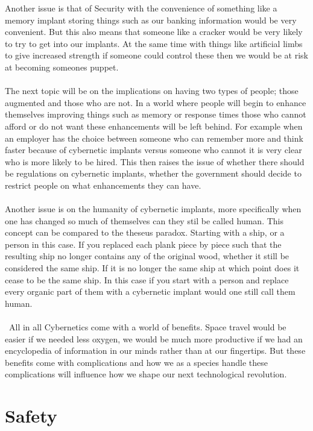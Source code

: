 \documentclass[12pt,a4paper,notitlepage]{article}
\begin{document}
    Another issue is that of Security with the convenience of something like a
memory implant storing things such as our banking information would be very
convenient. But this also means that someone like a cracker would be very likely
to try to get into our implants. At the same time with things like artificial
limbs to give increased strength if someone could control these then we would be
at risk at becoming someones puppet.
\\\\
    The next topic will be on the implications on having two types of people;
those augmented and those who are not. In a world where people will begin to
enhance themselves improving things such as memory or response times those who
cannot afford or do not want these enhancements will be left behind. For
example when an employer has the choice between someone who can remember more 
and think faster because of cybernetic implants versus someone who cannot it is
very clear who is more likely to be hired. This then raises the issue of whether
there should be regulations on cybernetic implants, whether the government
should decide to restrict people on what enhancements they can have. 
\\\\
    Another issue is on the humanity of cybernetic implants, more specifically
when one has changed so much of themselves can they stil be called human. This
concept can be compared to the theseus paradox. Starting with a ship, or a
person in this case. If you replaced each plank piece by piece such that the
resulting ship no longer contains any of the original wood, whether it still be
considered the same ship. If it is no longer the same ship at which point does
it cease to be the same ship. In this case if you start with a person and
replace every organic part of them with a cybernetic implant would one still
call them human.
\\\\\
    All in all Cybernetics come with a world of benefits. Space travel would be
easier if we needed less oxygen, we would be much more productive if we had an
encyclopedia of information in our minds rather than at our fingertips. But
these benefits come with complications and how we as a species handle these
complications will influence how we shape our next technological revolution.
    
\section{Safety}
\end{document}
